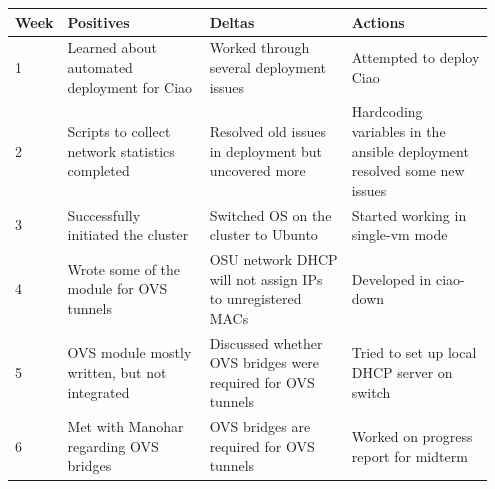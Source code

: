 \documentclass[10pt,onecolumn,journal,draftclsnofoot]{IEEEtran}
\begin{document}
\begin{center}
	\begin{tabular}{| p{0.05\linewidth} | p{0.3\linewidth} | p{0.3\linewidth} |
			p{0.3\linewidth} |}\hline
		Week & Positives & Deltas & Actions \\ \hline

		1 & Learned about automated deployment for Ciao & Worked through
		several deployment issues & Attempted to deploy Ciao \\ \hline

		2 & Scripts to collect network statistics completed & Resolved
		old issues in deployment but uncovered more & Hardcoding
		variables in the ansible deployment resolved some new issues \\
		\hline

		3 & Successfully initiated the cluster & Switched OS on the
		cluster to Ubunto & Started working in single-vm mode \\ \hline

		4 & Wrote some of the module for OVS tunnels & OSU network DHCP
		will not assign IPs to unregistered MACs & Developed in
		ciao-down \\ \hline

		5 & OVS module mostly written, but not integrated & Discussed
		whether OVS bridges were required for OVS tunnels & Tried to set
		up local DHCP server on switch \\ \hline

		6 & Met with Manohar regarding OVS bridges & OVS bridges are
		required for OVS tunnels & Worked on progress report for midterm
		\\ \hline

	\end{tabular}
\end{center}



\end{document}
